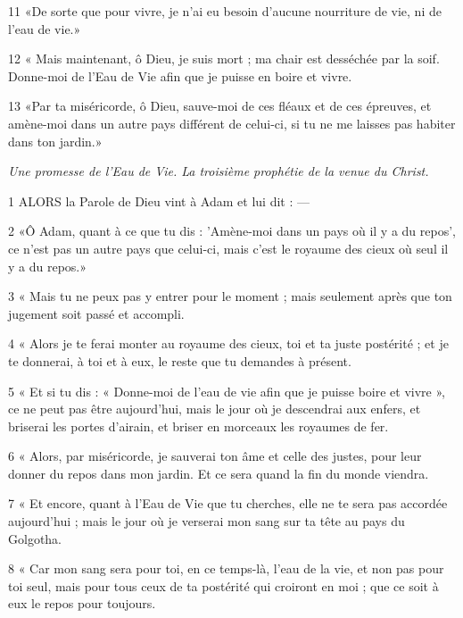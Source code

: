 \par 11 «De sorte que pour vivre, je n'ai eu besoin d'aucune nourriture de vie, ni de l'eau de vie.»

\par 12 « Mais maintenant, ô Dieu, je suis mort ; ma chair est desséchée par la soif. Donne-moi de l'Eau de Vie afin que je puisse en boire et vivre.

\par 13 «Par ta miséricorde, ô Dieu, sauve-moi de ces fléaux et de ces épreuves, et amène-moi dans un autre pays différent de celui-ci, si tu ne me laisses pas habiter dans ton jardin.»


\par \textit{Une promesse de l'Eau de Vie. La troisième prophétie de la venue du Christ.}

\par 1 ALORS la Parole de Dieu vint à Adam et lui dit : —

\par 2 «Ô Adam, quant à ce que tu dis : 'Amène-moi dans un pays où il y a du repos', ce n'est pas un autre pays que celui-ci, mais c'est le royaume des cieux où seul il y a du repos.»

\par 3 « Mais tu ne peux pas y entrer pour le moment ; mais seulement après que ton jugement soit passé et accompli.

\par 4 « Alors je te ferai monter au royaume des cieux, toi et ta juste postérité ; et je te donnerai, à toi et à eux, le reste que tu demandes à présent.

\par 5 « Et si tu dis : « Donne-moi de l'eau de vie afin que je puisse boire et vivre », ce ne peut pas être aujourd'hui, mais le jour où je descendrai aux enfers, et briserai les portes d'airain, et briser en morceaux les royaumes de fer.

\par 6 « Alors, par miséricorde, je sauverai ton âme et celle des justes, pour leur donner du repos dans mon jardin. Et ce sera quand la fin du monde viendra.

\par 7 « Et encore, quant à l'Eau de Vie que tu cherches, elle ne te sera pas accordée aujourd'hui ; mais le jour où je verserai mon sang sur ta tête au pays du Golgotha.

\par 8 « Car mon sang sera pour toi, en ce temps-là, l'eau de la vie, et non pas pour toi seul, mais pour tous ceux de ta postérité qui croiront en moi ; que ce soit à eux le repos pour toujours.

